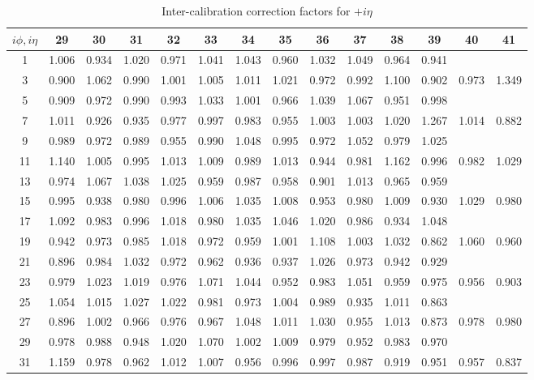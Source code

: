 \newpage
\begin{table}[!hp] 
\centering
\caption{Inter-calibration correction factors for $+i\eta$}
\label{tab:corrFacPosEta}
\begin{tabular}{c|ccccccccccccc}
\hline \hline
$i\phi,i\eta$ & 29 & 30 & 31 & 32 & 33 & 34 & 35 & 36 & 37 & 38 & 39 & 40 & 41 \\
\hline
1 & 1.006 & 0.934 & 1.020 & 0.971 & 1.041 & 1.043 & 0.960 & 1.032 & 1.049 & 0.964 & 0.941 \\
3 & 0.900 & 1.062 & 0.990 & 1.001 & 1.005 & 1.011 & 1.021 & 0.972 & 0.992 & 1.100 & 0.902 & 0.973 & 1.349 \\
5 & 0.909 & 0.972 & 0.990 & 0.993 & 1.033 & 1.001 & 0.966 & 1.039 & 1.067 & 0.951 & 0.998 \\
7 & 1.011 & 0.926 & 0.935 & 0.977 & 0.997 & 0.983 & 0.955 & 1.003 & 1.003 & 1.020 & 1.267 & 1.014 & 0.882 \\
9 & 0.989 & 0.972 & 0.989 & 0.955 & 0.990 & 1.048 & 0.995 & 0.972 & 1.052 & 0.979 & 1.025 \\
11 & 1.140 & 1.005 & 0.995 & 1.013 & 1.009 & 0.989 & 1.013 & 0.944 & 0.981 & 1.162 & 0.996 & 0.982 & 1.029 \\
13 & 0.974 & 1.067 & 1.038 & 1.025 & 0.959 & 0.987 & 0.958 & 0.901 & 1.013 & 0.965 & 0.959 \\
15 & 0.995 & 0.938 & 0.980 & 0.996 & 1.006 & 1.035 & 1.008 & 0.953 & 0.980 & 1.009 & 0.930 & 1.029 & 0.980 \\
17 & 1.092 & 0.983 & 0.996 & 1.018 & 0.980 & 1.035 & 1.046 & 1.020 & 0.986 & 0.934 & 1.048 \\
19 & 0.942 & 0.973 & 0.985 & 1.018 & 0.972 & 0.959 & 1.001 & 1.108 & 1.003 & 1.032 & 0.862 & 1.060 & 0.960 \\
21 & 0.896 & 0.984 & 1.032 & 0.972 & 0.962 & 0.936 & 0.937 & 1.026 & 0.973 & 0.942 & 0.929 \\
23 & 0.979 & 1.023 & 1.019 & 0.976 & 1.071 & 1.044 & 0.952 & 0.983 & 1.051 & 0.959 & 0.975 & 0.956 & 0.903 \\
25 & 1.054 & 1.015 & 1.027 & 1.022 & 0.981 & 0.973 & 1.004 & 0.989 & 0.935 & 1.011 & 0.863 \\
27 & 0.896 & 1.002 & 0.966 & 0.976 & 0.967 & 1.048 & 1.011 & 1.030 & 0.955 & 1.013 & 0.873 & 0.978 & 0.980 \\
29 & 0.978 & 0.988 & 0.948 & 1.020 & 1.070 & 1.002 & 1.009 & 0.979 & 0.952 & 0.983 & 0.970 \\
31 & 1.159 & 0.978 & 0.962 & 1.012 & 1.007 & 0.956 & 0.996 & 0.997 & 0.987 & 0.919 & 0.951 & 0.957 & 0.837 \\

\end{tabular}
\end{table}
